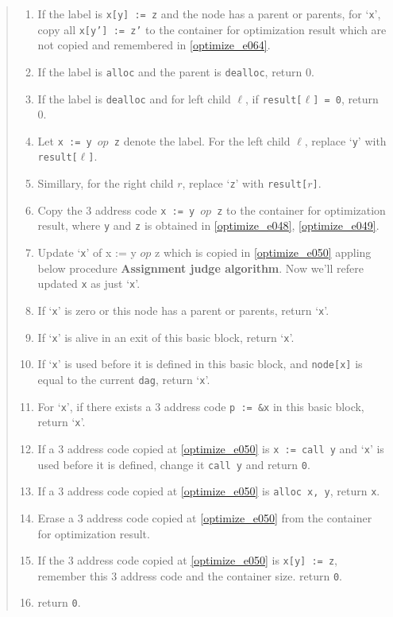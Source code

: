 \begin{quote}
\begin{enumerate}
\item \label{optimize_e108}
      If the label is {\tt{x[y] := z}} and the node has a parent or
      parents, for `{\tt{x}}', copy all {\tt{x[y'] := z'}} to
      the container  for optimization result
      which are not copied and remembered in \ref{optimize_e064}.
\item If the label is {\tt{alloc}} and the parent is {\tt{dealloc}},
      return 0.
\item If the label is {\tt{dealloc}} and for left child $\ell$,
      if {\tt{result[$\ell$] = 0}}, return 0.
\item \label{optimize_e048}
      Let {\tt{x := y $op$ z}} denote the label.
      For the left child $\ell$, replace `{\tt{y}}' with
      {\tt{result[$\ell$]}}.
\item \label{optimize_e049}
      Simillary, for the right child $r$, replace `{\tt{z}}'
      with {\tt{result[$r$]}}.
\item \label{optimize_e050}
      Copy the 3 address code {\tt{x := y $op$ z}} to the container
      for optimization result, where {\tt{y}} and {\tt{z}}
      is obtained in \ref{optimize_e048}, \ref{optimize_e049}.
\item Update `{\tt{x}}' of {x := y $op$ z} which is copied in
      \ref{optimize_e050} appling below procedure
      {\bf Assignment judge algorithm}. Now we'll refere updated
       {\tt{x}} as just `{\tt{x}}'.
\item  If `{\tt{x}}' is zero or this node has a parent or parents,
       return `{\tt{x}}'.
\item If `{\tt{x}}' is alive in an exit of this basic block,
      return `{\tt{x}}'.
\item If `{\tt{x}}' is used before it is defined
      in this basic block, and  {\tt{node[x]}} is equal to
      the current {\tt{dag}}, return `{\tt{x}}'.
\item For `{\tt{x}}', if there exists a 3 address code {\tt{p := \&x}} in this
      basic block, return `{\tt{x}}'.
\item \label{optimize_e057}
      If a 3 address code copied at \ref{optimize_e050} is
      {\tt{x := call y}} and `{\tt{x}}' is used before it is
      defined, change it {\tt{call y}} and return {\tt{0}}.
\item If a 3 address code copied at \ref{optimize_e050} is
      {\tt{alloc x, y}}, return {\tt{x}}.
\item \label{optimize_e056}
      Erase a 3 address code copied at \ref{optimize_e050} 
      from the container for optimization result.
\item \label{optimize_e064}
      If the 3 address code copied at \ref{optimize_e050} is
      {\tt{x[y] := z}}, remember this 3 address code and the
      container size. return {\tt{0}}.
\item return {\tt{0}}.
\end{enumerate}
\end{quote}

